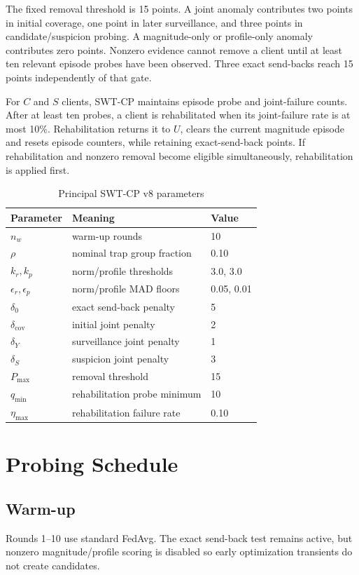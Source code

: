 The fixed removal threshold is 15 points. A joint anomaly contributes two points in initial coverage, one point in later surveillance, and three points in candidate/suspicion probing. A magnitude-only or profile-only anomaly contributes zero points. Nonzero evidence cannot remove a client until at least ten relevant episode probes have been observed. Three exact send-backs reach 15 points independently of that gate.

For $C$ and $S$ clients, SWT-CP maintains episode probe and joint-failure counts. After at least ten probes, a client is rehabilitated when its joint-failure rate is at most 10\%. Rehabilitation returns it to $U$, clears the current magnitude episode and resets episode counters, while retaining exact-send-back points. If rehabilitation and nonzero removal become eligible simultaneously, rehabilitation is applied first.

\begin{table}[htbp]
\centering
\caption{Principal SWT-CP v8 parameters}
\label{tab:v8-parameters}
\begin{tabular}{lll}
\toprule
Parameter & Meaning & Value \\
\midrule
$n_w$ & warm-up rounds & 10 \\
$\rho$ & nominal trap group fraction & 0.10 \\
$k_r,k_p$ & norm/profile thresholds & 3.0, 3.0 \\
$\epsilon_r,\epsilon_p$ & norm/profile MAD floors & 0.05, 0.01 \\
$\delta_0$ & exact send-back penalty & 5 \\
$\delta_{\mathrm{cov}}$ & initial joint penalty & 2 \\
$\delta_Y$ & surveillance joint penalty & 1 \\
$\delta_S$ & suspicion joint penalty & 3 \\
$P_{\max}$ & removal threshold & 15 \\
$q_{\min}$ & rehabilitation probe minimum & 10 \\
$\eta_{\max}$ & rehabilitation failure rate & 0.10 \\
\bottomrule
\end{tabular}
\end{table}

\section{Probing Schedule}

\subsection{Warm-up}
Rounds 1--10 use standard FedAvg. The exact send-back test remains active, but nonzero magnitude/profile scoring is disabled so early optimization transients do not create candidates.

